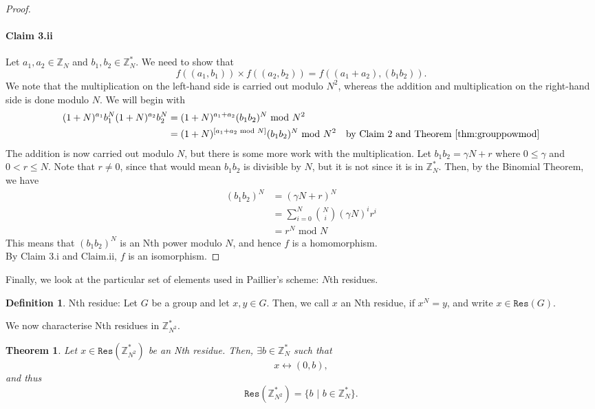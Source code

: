 \documentclass{article}
\newtheorem{theorem}{Theorem}[section]
\theoremstyle{definition}
\newtheorem{definition}{Definition}[section]
\newcommand{\Int}{\mathbb{Z}}
\renewcommand{\mod}{\,\,\text{mod}\,\,}
\begin{document}
\begin{proof}
  \paragraph{Claim 3.ii} Let $a_1, a_2 \in \Int_N$ and $b_1, b_2 \in \Int_N^*$. We need to show that
  \[
    f((a_1, b_1)) \times f((a_2, b_2)) = f((a_1 + a_2), (b_1b_2)).
  \]
  We note that the multiplication on the left-hand side is carried out modulo
  $N^2$, whereas the addition and multiplication on the right-hand side is done
  modulo $N$. We will begin with
  \begin{align*}
    (1 + N)^{a_1}b_1^N(1 + N)^{a_2}b_2^N &= (1 + N)^{a_1 + a_2}(b_1b_2)^N \mod N^2 \\
                                         &= (1 + N)^{[a_1 + a_2 \mod N]}(b_1b_2)^N \mod N^2 \quad \text{by Claim 2 and Theorem \ref{thm:grouppowmod}}
  \end{align*}
  The addition is now carried out modulo $N$, but there is some more work with
  the multiplication. Let $b_1b_2 = \gamma N + r$ where $0 \leq \gamma$ and $0 <
  r \leq N$. Note that $r \neq 0$, since that would mean $b_1b_2$ is divisible
  by $N$, but it is not since it is in $\Int_N^*$. Then, by the Binomial
  Theorem, we have
  \begin{align*}
    (b_1b_2)^N &= (\gamma N + r)^N \\
               &= \sum_{i = 0}^N \binom{N}{i}(\gamma N)^ir^i \\
               &= r^N \mod N
  \end{align*}
  This means that $(b_1b_2)^N$ is an Nth power modulo $N$, and hence $f$ is a
  homomorphism. \\
  By Claim 3.i and Claim.ii, $f$ is an isomorphism.
\end{proof}
Finally, we look at the particular set of elements used in Paillier's scheme:
$N$th residues.
\begin{definition}{Nth residue:} Let $G$ be a group and let $x, y \in G$. Then, we call $x$
  an Nth residue, if $x^N = y$, and write $x \in \texttt{Res}(G)$.
\end{definition}
We now characterise Nth residues in $\Int_{N^2}^*$.
\begin{theorem}
  Let $x \in \texttt{Res}(\Int_{N^2}^*)$ be an Nth residue. Then, $\exists b \in
  \Int_N^*$ such that
  \[
    x \leftrightarrow (0, b),
  \]
  and thus
  \[
    \texttt{Res}(\Int_{N^2}^*) = \{b \,\,|\,\, b \in \Int_N^*\}.
  \]
\end{theorem}
\end{document}
